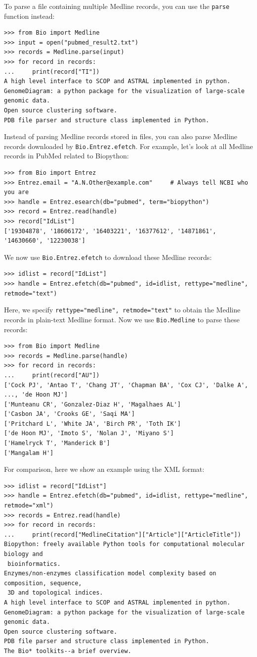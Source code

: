 \documentclass{report}
\begin{document}
To parse a file containing multiple Medline records, you can use the \verb+parse+ function instead:
\begin{verbatim}
>>> from Bio import Medline
>>> input = open("pubmed_result2.txt")
>>> records = Medline.parse(input)
>>> for record in records:
...     print(record["TI"])
A high level interface to SCOP and ASTRAL implemented in python.
GenomeDiagram: a python package for the visualization of large-scale genomic data.
Open source clustering software.
PDB file parser and structure class implemented in Python.
\end{verbatim}

Instead of parsing Medline records stored in files, you can also parse Medline records downloaded by \verb+Bio.Entrez.efetch+. For example, let's look at all Medline records in PubMed related to Biopython:
\begin{verbatim}
>>> from Bio import Entrez
>>> Entrez.email = "A.N.Other@example.com"     # Always tell NCBI who you are
>>> handle = Entrez.esearch(db="pubmed", term="biopython")
>>> record = Entrez.read(handle)
>>> record["IdList"]
['19304878', '18606172', '16403221', '16377612', '14871861', '14630660', '12230038']
\end{verbatim}
We now use \verb+Bio.Entrez.efetch+ to download these Medline records:
\begin{verbatim}
>>> idlist = record["IdList"]
>>> handle = Entrez.efetch(db="pubmed", id=idlist, rettype="medline", retmode="text")
\end{verbatim}
Here, we specify \verb+rettype="medline", retmode="text"+ to obtain the Medline records in plain-text Medline format. Now we use \verb+Bio.Medline+ to parse these records:
\begin{verbatim}
>>> from Bio import Medline
>>> records = Medline.parse(handle)
>>> for record in records:
...     print(record["AU"])
['Cock PJ', 'Antao T', 'Chang JT', 'Chapman BA', 'Cox CJ', 'Dalke A', ..., 'de Hoon MJ']
['Munteanu CR', 'Gonzalez-Diaz H', 'Magalhaes AL']
['Casbon JA', 'Crooks GE', 'Saqi MA']
['Pritchard L', 'White JA', 'Birch PR', 'Toth IK']
['de Hoon MJ', 'Imoto S', 'Nolan J', 'Miyano S']
['Hamelryck T', 'Manderick B']
['Mangalam H']
\end{verbatim}

For comparison, here we show an example using the XML format:
\begin{verbatim}
>>> idlist = record["IdList"]
>>> handle = Entrez.efetch(db="pubmed", id=idlist, rettype="medline", retmode="xml")
>>> records = Entrez.read(handle)
>>> for record in records:
...     print(record["MedlineCitation"]["Article"]["ArticleTitle"])
Biopython: freely available Python tools for computational molecular biology and
 bioinformatics.
Enzymes/non-enzymes classification model complexity based on composition, sequence,
 3D and topological indices.
A high level interface to SCOP and ASTRAL implemented in python.
GenomeDiagram: a python package for the visualization of large-scale genomic data.
Open source clustering software.
PDB file parser and structure class implemented in Python.
The Bio* toolkits--a brief overview.
\end{verbatim}
\end{document}
